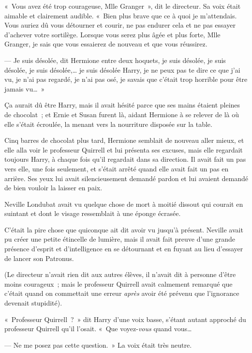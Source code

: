 «~Vous avez été trop courageuse, Mlle Granger~», dit le directeur. Sa voix était aimable et clairement audible. «~Bien plus brave que ce à quoi je m'attendais. Vous auriez dû vous détourner et courir, ne pas endurer cela et ne pas essayer d'achever votre sortilège. Lorsque vous serez plus âgée et plus forte, Mlle Granger, je sais que vous essaierez de nouveau et que vous réussirez.

--- Je suis désolée, dit Hermione entre deux hoquets, je suis désolée, je suis désolée, je suis désolée,… je suis désolée Harry, je ne peux pas te dire ce que j'ai vu, je n'ai pas regardé, je n'ai pas osé, je savais que c'était trop horrible pour être jamais vu…~»

Ça aurait dû être Harry, mais il avait hésité parce que ses mains étaient pleines de chocolat~; et Ernie et Susan furent là, aidant Hermione à se relever de là où elle s'était écroulée, la menant vers la nourriture disposée sur la table.

Cinq barres de chocolat plus tard, Hermione semblait de nouveau aller mieux, et elle alla voir le professeur Quirrell et lui présenta ses excuses, mais elle regardait toujours Harry, à chaque fois qu'il regardait dans sa direction. Il avait fait un pas vers elle, une fois seulement, et s'était arrêté quand elle avait fait un pas en arrière. Ses yeux lui avait silencieusement demandé pardon et lui avaient demandé de bien vouloir la laisser en paix.

\later

Neville Londubat avait vu quelque chose de mort à moitié dissout qui courait en suintant et dont le visage ressemblait à une éponge écrasée.

C'était la pire chose que quiconque ait dit avoir vu jusqu'à présent. Neville avait pu créer une petite étincelle de lumière, mais il avait fait preuve d'une grande présence d'esprit et d'intelligence en se détournant et en fuyant au lieu d'essayer de lancer son Patronus.

(Le directeur n'avait rien dit aux autres élèves, il n'avait dit à personne d'être moins courageux~; mais le professeur Quirrell avait calmement remarqué que c'était quand on commettait une erreur \emph{après} avoir été prévenu que l'ignorance devenait stupidité).

«~Professeur Quirrell~?~» dit Harry d'une voix basse, s'étant autant approché du professeur Quirrell qu'il l'osait. «~Que voyez-\emph{vous} quand vous…

--- Ne me posez pas cette question.~» La voix était très neutre.

